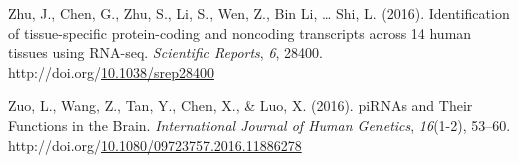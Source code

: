 \documentclass[12pt,twoside]{reedthesis}
\newlength{\cslhangindent}
\newenvironment{CSLReferences}[2] %
 {%
  \setlength{\parindent}{0pt}
  \ifodd #1 \everypar{\setlength{\hangindent}{\cslhangindent}}\ignorespaces\fi
  \ifnum #2 > 0
  \setlength{\parskip}{#2\baselineskip}
  \fi
 }%
 {}
\begin{document}
\begin{CSLReferences}{1}{0}
\leavevmode{}%
Zhu, J., Chen, G., Zhu, S., Li, S., Wen, Z., Bin Li, \ldots{} Shi, L. (2016). Identification of tissue-specific protein-coding and noncoding transcripts across 14 human tissues using RNA-seq. \emph{Scientific Reports}, \emph{6}, 28400. http://doi.org/\href{https://doi.org/10.1038/srep28400}{10.1038/srep28400}

\leavevmode{}%
Zuo, L., Wang, Z., Tan, Y., Chen, X., \& Luo, X. (2016). piRNAs and Their Functions in the Brain. \emph{International Journal of Human Genetics}, \emph{16}(1-2), 53--60. http://doi.org/\href{https://doi.org/10.1080/09723757.2016.11886278}{10.1080/09723757.2016.11886278}

\end{CSLReferences}

\end{document}
